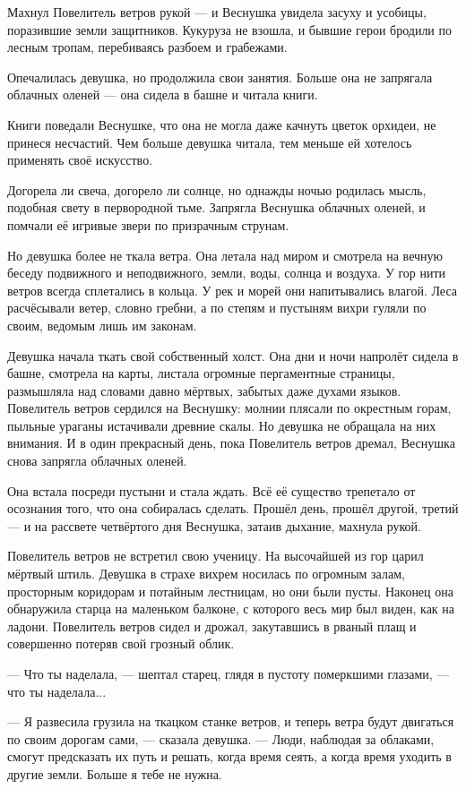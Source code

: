 Махнул Повелитель ветров рукой --- и Веснушка увидела засуху и усобицы, поразившие земли защитников.
Кукуруза не взошла, и бывшие герои бродили по лесным тропам, перебиваясь разбоем и грабежами.

Опечалилась девушка, но продолжила свои занятия.
Больше она не запрягала облачных оленей --- она сидела в башне и читала книги.

Книги поведали Веснушке, что она не могла даже качнуть цветок орхидеи, не принеся несчастий.
Чем больше девушка читала, тем меньше ей хотелось применять своё искусство.

Догорела ли свеча, догорело ли солнце, но однажды ночью родилась мысль, подобная свету в первородной тьме.
Запрягла Веснушка облачных оленей, и помчали её игривые звери по призрачным струнам.

Но девушка более не ткала ветра.
Она летала над миром и смотрела на вечную беседу подвижного и неподвижного, земли, воды, солнца и воздуха.
У гор нити ветров всегда сплетались в кольца.
У рек и морей они напитывались влагой.
Леса расчёсывали ветер, словно гребни, а по степям и пустыням вихри гуляли по своим, ведомым лишь им законам.

Девушка начала ткать свой собственный холст.
Она дни и ночи напролёт сидела в башне, смотрела на карты, листала огромные пергаментные страницы, размышляла над словами давно мёртвых, забытых даже духами языков.
Повелитель ветров сердился на Веснушку: молнии плясали по окрестным горам, пыльные ураганы истачивали древние скалы.
Но девушка не обращала на них внимания.
И в один прекрасный день, пока Повелитель ветров дремал, Веснушка снова запрягла облачных оленей.

Она встала посреди пустыни и стала ждать.
Всё её существо трепетало от осознания того, что она собиралась сделать.
Прошёл день, прошёл другой, третий --- и на рассвете четвёртого дня Веснушка, затаив дыхание, махнула рукой.

Повелитель ветров не встретил свою ученицу.
На высочайшей из гор царил мёртвый штиль.
Девушка в страхе вихрем носилась по огромным залам, просторным коридорам и потайным лестницам, но они были пусты.
Наконец она обнаружила старца на маленьком балконе, с которого весь мир был виден, как на ладони.
Повелитель ветров сидел и дрожал, закутавшись в рваный плащ и совершенно потеряв свой грозный облик.

--- Что ты наделала, --- шептал старец, глядя в пустоту померкшими глазами,
--- что ты наделала...

--- Я развесила грузила на ткацком станке ветров, и теперь ветра будут двигаться по своим дорогам сами, --- сказала девушка.
--- Люди, наблюдая за облаками, смогут предсказать их путь и решать, когда время сеять, а когда время уходить в другие земли.
Больше я тебе не нужна.

